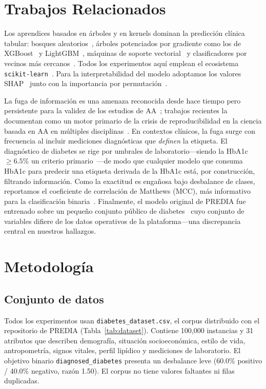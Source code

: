 \documentclass[conference]{IEEEtran}
\begin{document}
\section{Trabajos Relacionados}
Los aprendices basados en árboles y en kernels dominan la predicción clínica
tabular: bosques aleatorios~\cite{breiman2001random}, árboles potenciados por
gradiente como los de XGBoost~\cite{chen2016xgboost} y
LightGBM~\cite{ke2017lightgbm}, máquinas de soporte
vectorial~\cite{cortes1995svm} y clasificadores por vecinos más
cercanos~\cite{cover1967knn}. Todos los experimentos aquí emplean el ecosistema
\texttt{scikit-learn}~\cite{pedregosa2011scikit}. Para la interpretabilidad del
modelo adoptamos los valores SHAP~\cite{lundberg2017shap} junto con la
importancia por permutación~\cite{breiman2001random}.

La fuga de información es una amenaza reconocida desde hace tiempo pero
persistente para la validez de los estudios de AA~\cite{kaufman2012leakage};
trabajos recientes la documentan como un motor primario de la crisis de
reproducibilidad en la ciencia basada en AA en múltiples
disciplinas~\cite{kapoor2023leakage}. En contextos clínicos, la fuga surge con
frecuencia al incluir mediciones diagnósticas que \emph{definen} la etiqueta. El
diagnóstico de diabetes se rige por umbrales de laboratorio---siendo la HbA1c
$\geq 6.5\%$ un criterio primario~\cite{ada2021classification}---de modo que
cualquier modelo que consuma HbA1c para predecir una etiqueta derivada de la
HbA1c está, por construcción, filtrando información. Como la exactitud es
engañosa bajo desbalance de clases, reportamos el coeficiente de correlación de
Matthews (MCC), más informativo para la clasificación
binaria~\cite{chicco2020mcc}. Finalmente, el modelo original de PREDIA fue
entrenado sobre un pequeño conjunto público de diabetes~\cite{rashid2020diabetes}
cuyo conjunto de variables difiere de los datos operativos de la
plataforma---una discrepancia central en nuestros hallazgos.

\section{Metodología}
\subsection{Conjunto de datos}
Todos los experimentos usan \texttt{diabetes\_dataset.csv}, el corpus
distribuido con el repositorio de PREDIA (Tabla~\ref{tab:dataset}). Contiene
100{,}000 instancias y 31 atributos que describen demografía, situación
socioeconómica, estilo de vida, antropometría, signos vitales, perfil lipídico y
mediciones de laboratorio. El objetivo binario \texttt{diagnosed\_diabetes}
presenta un desbalance leve (60.0\% positivo / 40.0\% negativo, razón 1.50). El
corpus no tiene valores faltantes ni filas duplicadas.
\end{document}
